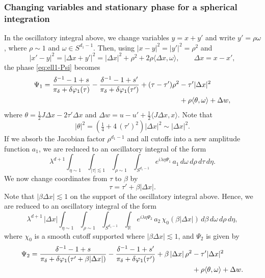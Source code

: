 \documentclass[leqno]{amsart}
\theoremstyle{definition}
\theoremstyle{remark}
\numberwithin{equation}{section}
\newcommand{\R}{\mathbb{R}}
\begin{document}
\subsubsection{Changing variables and stationary phase for a spherical integration}

In the oscillatory integral above, we change variables $y= x +y'$ and write $y'=\rho\omega$, where $\rho\sim 1$ and $\omega\in S^{d_1-1}$. Then, using $| x -y|^2=|y'|^2=\rho^2$ and
\[
| x'-y|^2
= |\Delta x + y'|^2
= |\Delta x|^2 + \rho^2 + 2\rho\langle \Delta x,\omega\rangle,
\qquad \Delta x = x-x',
\]
the phase \eqref{eq:ell1-Psi} becomes
\begin{align}\label{eq:Psi1-k1-ell1}
\Psi_1
=
\frac{\delta^{-1}-1+s}{\pi_\delta+\delta\varphi_1(\tau)}
-\frac{\delta^{-1}-1+s'}{\pi_\delta+\delta\varphi_1(\tau')}
+(\tau-\tau')\rho^2
& -\tau' |\Delta x |^2 \\
& +\rho\langle\theta,\omega\rangle
+\Delta w, \notag
\end{align}
where $\theta = \tfrac12J\Delta x -2\tau' \Delta x$ and $\Delta w = u-u' + \tfrac 12\langle J\Delta x,x\rangle$.
Note that
\begin{equation}\label{eq:theta-size}
|\theta|^2=\left(\tfrac14+4\,(\tau')^2\right)|\Delta x |^2\sim |\Delta x |^2.
\end{equation}
If we absorb the Jacobian factor $\rho^{d_1-1}$ and all cutoffs into a new amplitude function $a_1$, we are reduced to an oscillatory integral of the form
\begin{equation}\label{eq:Qtauprime-prebeta}
\lambda^{d+1}\int_{\eta\sim1}\int_{|\tau|\lesssim 1}\int_{\rho\sim1}\int_{S^{d_1-1}}
e^{i\lambda\eta \Psi_1}\, a_1 \,d\omega\,d\rho\,d\tau \,d\eta.
\end{equation}
We now change coordinates from $\tau$ to $\beta$ by
\[
\tau = \tau' +\beta|\Delta x|.
\]
Note that $|\beta \Delta x|\lesssim 1$ on the support of the oscillatory integral above. Hence, we are reduced to an oscillatory integral of the form
\begin{equation}\label{eq:Qbeta-ell1}
\lambda^{d+1}\,|\Delta x|
\int_{\eta\sim1}\int_{\rho\sim1}\int_{S^{d_1-1}}\int_{\R}
e^{i\lambda\eta \Psi_2 }\,
  a_2\, \chi_0(\beta|\Delta x|)\,
d\beta\,d\omega\,d\rho\,d\eta,
\end{equation}
where $\chi_0$ is a smooth cutoff supported where $|\beta\Delta x|\lesssim 1$, and $\Psi_2 $ is given by
\begin{align}\label{eq:Psi2-k1-ell1}
\Psi_2 
 = \frac{\delta^{-1}-1+s}{\pi_\delta+\delta\varphi_1(\tau'+\beta|\Delta x|)}
 -\frac{\delta^{-1}-1+s'}{\pi_\delta+\delta\varphi_1(\tau')} 
 +\beta\,|\Delta x|\,\rho^2
 &- \tau' |\Delta x|^2 \\
 &+ \rho \langle  \theta , \omega\rangle
 + \Delta w. \notag
\end{align}
\end{document}

